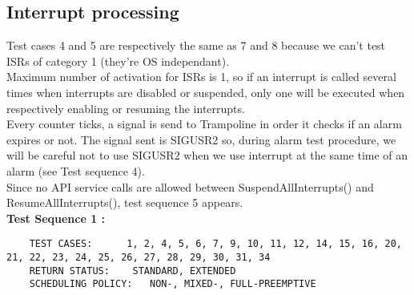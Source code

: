 \documentclass[10pt]{article}
\begin{document}
\subsection{Interrupt processing}
	Test cases 4 and 5 are respectively the same as 7 and 8 because we can't test ISRs of category 1 (they're OS independant). \\
	Maximum number of activation for ISRs is 1, so if an interrupt is called several times when interrupts are disabled or suspended, only one will be executed when respectively enabling or resuming the interrupts.\\
	Every counter ticks, a signal is send to Trampoline in order it checks if an alarm expires or not. The signal sent is SIGUSR2 so, during alarm test procedure, we will be careful not to use SIGUSR2 when we use interrupt at the same time of an alarm (see Test sequence 4). \\
	Since no API service calls are allowed between SuspendAllInterrupts() and ResumeAllInterrupts(), test sequence 5 appears.\\
	
	\textbf{Test Sequence 1 :} 
	\begin{lstlisting}
	TEST CASES:		 1, 2, 4, 5, 6, 7, 9, 10, 11, 12, 14, 15, 16, 20, 21, 22, 23, 24, 25, 26, 27, 28, 29, 30, 31, 34
	RETURN STATUS:	  STANDARD, EXTENDED
	SCHEDULING POLICY:   NON-, MIXED-, FULL-PREEMPTIVE
	\end{lstlisting}
	
\end{document}
